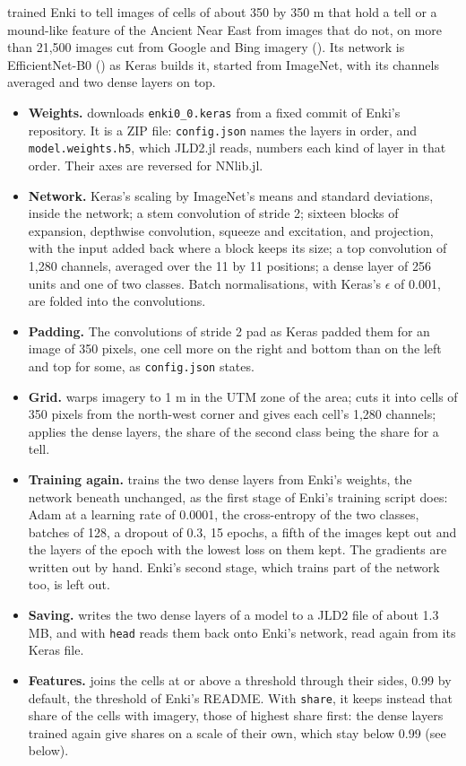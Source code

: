  trained Enki to tell images of cells of about 350 by 350 m that hold a tell or a
mound-like feature of the Ancient Near East from images that do not, on more than 21,500 images cut from Google and
Bing imagery (). Its network is EfficientNet-B0 () as Keras builds it, started from ImageNet, with its channels averaged and two dense layers on top.
\begin{itemize}
\item \textbf{Weights.}  downloads \texttt{enki0\_0.keras} from a fixed commit of Enki's repository.
  It is a ZIP file: \texttt{config.json} names the layers in order, and \texttt{model.weights.h5}, which JLD2.jl reads,
  numbers each kind of layer in that order. Their axes are reversed for NNlib.jl.
\item \textbf{Network.} Keras's scaling by ImageNet's means and standard deviations, inside the network; a stem
  convolution of stride 2; sixteen blocks of expansion, depthwise convolution, squeeze and excitation, and projection,
  with the input added back where a block keeps its size; a top convolution of 1,280 channels, averaged over the 11 by
  11 positions; a dense layer of 256 units and one of two classes. Batch normalisations, with Keras's $\epsilon$ of
  0.001, are folded into the convolutions.
\item \textbf{Padding.} The convolutions of stride 2 pad as Keras padded them for an image of 350 pixels, one cell
  more on the right and bottom than on the left and top for some, as \texttt{config.json} states.
\item \textbf{Grid.}  warps imagery to 1 m in the UTM zone of the area;  cuts it
  into cells of 350 pixels from the north-west corner and gives each cell's 1,280 channels; 
  applies the dense layers, the share of the second class being the share for a tell.
\item \textbf{Training again.}  trains the two dense layers from Enki's weights, the network
  beneath unchanged, as the first stage of Enki's training script does: Adam at a learning rate of 0.0001, the
  cross-entropy of the two classes, batches of 128, a dropout of 0.3, 15 epochs, a fifth of the images kept out and
  the layers of the epoch with the lowest loss on them kept. The gradients are written out by hand. Enki's second
  stage, which trains part of the network too, is left out.
\item \textbf{Saving.}  writes the two dense layers of a model to a JLD2 file of about 1.3 MB, and
   with \texttt{head} reads them back onto Enki's network, read again from its Keras file.
\item \textbf{Features.}  joins the cells at or above a threshold through their sides, 0.99 by
  default, the threshold of Enki's README. With \texttt{share}, it keeps instead that share of the cells with imagery,
  those of highest share first: the dense layers trained again give shares on a scale of their own, which stay below
  0.99 (see below).
\end{itemize}

